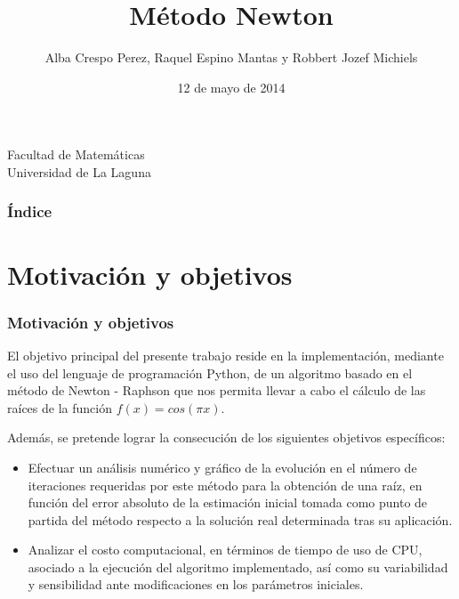 \documentclass{beamer}
\title[Búsqueda de raíces mediante el método de Newton - Raphson ]{Método Newton}
\author[Tecnicas Experimentales]{Alba Crespo Perez, Raquel Espino Mantas y Robbert Jozef Michiels}
\date[12-05-2014]{12 de mayo de 2014}
\begin{document}
  
\begin{frame}
  \titlepage
  \begin{small}
    \begin{center}
     Facultad de Matemáticas \\
     Universidad de La Laguna
    \end{center}
  \end{small}

\end{frame}

\begin{frame}
  \frametitle{Índice}
  \tableofcontents[pausesections]
\end{frame}


\section{Motivación y objetivos}


\begin{frame}

\frametitle{Motivación y objetivos}

  
El objetivo principal del presente trabajo reside en la implementación, mediante
el uso del lenguaje de programación Python, de un algoritmo basado en el método
de Newton - Raphson que nos permita llevar a cabo el cálculo de las raíces de la
función $f(x) = cos(\pi x)$.

Además, se pretende lograr la consecución de los siguientes objetivos específicos:
  \begin{itemize}
  \item
  Efectuar un análisis numérico y gráfico de la evolución en el número de 
  iteraciones requeridas por este método para la obtención de una raíz, en
  función del error absoluto de la estimación inicial tomada como punto de 
  partida del método respecto a la solución real determinada tras su aplicación.
  \pause
  \item
   Analizar el costo computacional, en términos de tiempo de uso de CPU, asociado 
   a la ejecución del algoritmo implementado, así como su variabilidad y sensibilidad
   ante modificaciones en los parámetros iniciales.
  \end{itemize}

\end{frame}
\end{document}
